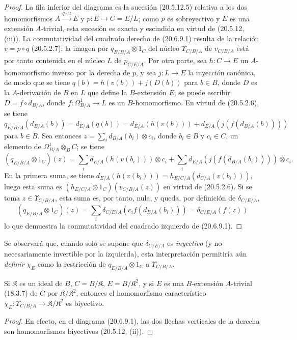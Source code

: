 \begin{proof}
La fila inferior del diagrama es la sucesión (20.5.12.5) relativa a los
dos homomorfismos $A\xrightarrow{q\circ u}E$ y
$p:E\to C=E/L$; como $p$ es sobreyectivo y $E$ es una extensión
$A$-trivial, esta sucesión es exacta y escindida en virtud de (20.5.12,
(iii)). La conmutatividad del cuadrado derecho de (20.6.9.1) resulta de la
relación $v=p\circ q$ (20.5.2.7); la imagen por
$q_{E/B/A}\otimes1_C$ del núcleo $\Upsilon_{C/B/A}$ de $v_{C/B/A}$ está
por tanto contenida en el núcleo $L$ de $p_{C/E/A}$. Por otra parte, sea
$h:C\to E$ un $A$-homomorfismo inverso por la derecha de $p$, y sea
$j:L\to E$ la inyección canónica, de modo que se tiene
$q(b)=h(v(b))+j(D(b))$ para $b\in B$, donde $D$ es la $A$-derivación de
$B$ en $L$ que define la $B$-extensión $E$; se puede escribir
$D=f\circ d_{B/A}$, donde $f:\Omega^1_{B/A}\to L$ es un
$B$-homomorfismo. En virtud de (20.5.2.6), se tiene
$q_{E/B/A}(d_{B/A}(b))=d_{E/A}(q(b))=d_{E/A}(h(v(b)))+d_{E/A}(j(f(d_{B/A}(b))))$
para $b\in B$. Sea entonces
$z=\sum_i d_{B/A}(b_i)\otimes c_i$, donde $b_i\in B$ y $c_i\in C$, un
elemento de $\Omega^1_{B/A}\otimes_B C$; se tiene
\[
  (q_{E/B/A}\otimes1_C)(z)=
  \sum_i d_{E/A}(h(v(b_i)))\otimes c_i+
  \sum_i d_{E/A}(j(f(d_{B/A}(b_i))))\otimes c_i.
\]
En la primera suma, se tiene
$d_{E/A}(h(v(b_i)))=h_{E/C/A}(d_{C/A}(v(b_i)))$, luego esta suma es
$(h_{E/C/A}\otimes1_C)(v_{C/B/A}(z))$ en virtud de (20.5.2.6). Si se
toma $z\in\Upsilon_{C/B/A}$, esta suma es, por tanto, nula, y queda,
por definición de $\delta_{C/E/A}$,
\[
  (q_{E/B/A}\otimes1_C)(z)=
  \sum_i\delta_{C/E/A}(c_i f(d_{B/A}(b_i)))
  =\delta_{C/E/A}(f(z))
\]
lo que demuestra la conmutatividad del cuadrado izquierdo de (20.6.9.1).
\end{proof}

Se observará que, cuando solo se supone que $\delta_{C/E/A}$ es
\emph{inyectivo} (y no necesariamente invertible por la izquierda), esta
interpretación permitiría aún \emph{definir} $\chi_E$ como la
restricción de $q_{E/B/A}\otimes1_C$ a $\Upsilon_{C/B/A}$.

\begin{corollary}[20.6.10]
\label{0.20.6.10-fr}
Si $\mathfrak{K}$ es un ideal de $B$, $C=B/\mathfrak{K}$,
$E=B/\mathfrak{K}^2$, y si $E$ es una $B$-extensión $A$-trivial
\textup{(18.3.7)} de $C$ por $\mathfrak{K}/\mathfrak{K}^2$, entonces
el homomorfismo característico
$\chi_E:\Upsilon_{C/B/A}\to\mathfrak{K}/\mathfrak{K}^2$ es biyectivo.
\end{corollary}
\begin{proof}
En efecto, en el diagrama (20.6.9.1), las dos flechas verticales de la
derecha son homomorfismos biyectivos (20.5.12, (ii)).
\end{proof}

